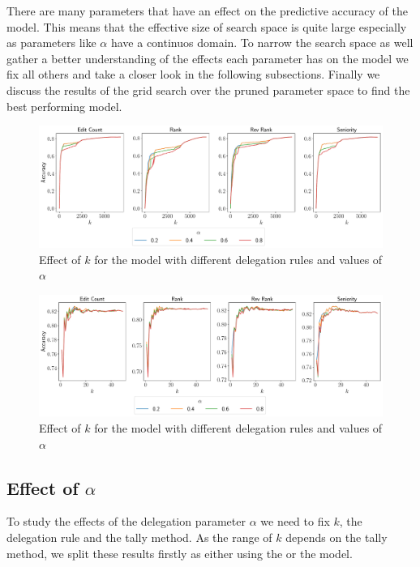 There are many parameters that have an effect on the predictive accuracy of the model. This means that the effective size of search space is quite large especially as parameters like $\alpha$ have a continuos domain. To narrow the search space as well gather a better understanding of the effects each parameter has on the model we fix all others and take a closer look in the following subsections. Finally we discuss the results of the grid search over the pruned parameter space to find the best performing model.

\begin{figure}[t]
    \centering
    \includegraphics[width=\linewidth]{images/k_global.pdf}
    \caption{Effect of $k$ for the \globalv model with different delegation rules and values of $\alpha$}
    \label{fig:global-k}
\end{figure}
\begin{figure}[t]
    \centering
    \includegraphics[width=\linewidth]{images/k_local.pdf}
    \caption{Effect of $k$ for the \localv model with different delegation rules and values of $\alpha$}
    \label{fig:local-k}
\end{figure}
\subsection{Effect of $\alpha$}
To study the effects of the delegation parameter $\alpha$ we need to fix $k$, the delegation rule and the tally method. As the range of $k$ depends on the tally method, we split these results firstly as either using the \globalv or the \localv model.

